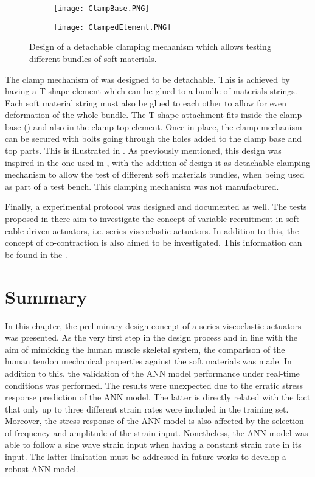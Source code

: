 \begin{figure}[htb!]
	\centering
    \begin{subfigure}[b]{0.49\textwidth}
        \centering
        \texttt{[image: ClampBase.PNG]}
        \caption{}
        \label{fig:ClampBase}
    \end{subfigure}
    \begin{subfigure}[b]{0.49\textwidth}
        \centering
        \texttt{[image: ClampedElement.PNG]}
        \caption{}
        \label{fig:ClampElement}
    \end{subfigure}
    \caption{Design of a detachable clamping mechanism which allows testing different bundles of soft materials.}
    \label{fig:ClampWhole}
\end{figure}

The clamp mechanism of  was designed to be detachable. This is achieved by having a T-shape element which can be glued to a bundle of materials strings. Each soft material string must also be glued to each other to allow for even deformation of the whole bundle. The T-shape attachment fits inside the clamp base () and also in the clamp top element. Once in place, the clamp mechanism can be secured with bolts going through the holes added to the clamp base and top parts. This is illustrated in . As previously mentioned, this design was inspired in the one used in \cite{austin2015control}, with the addition of design it as detachable clamping mechanism to allow the test of different soft materials bundles, when being used as part of a test bench. This clamping mechanism was not manufactured.

Finally, a experimental protocol was designed and documented as well. The tests proposed in there aim to investigate the concept of variable recruitment in soft cable-driven actuators, i.e. series-viscoelastic actuators. In addition to this, the concept of co-contraction is also aimed to be investigated. This information can be found in the .

\section{Summary}


In this chapter, the preliminary design concept of a series-viscoelastic actuators was presented. As the very first step in the design process and in line with the aim of mimicking the human muscle skeletal system, the comparison of the human tendon mechanical properties against the soft materials was made. In addition to this, the validation of the ANN model performance under real-time conditions was performed. The results were unexpected due to the erratic stress response prediction of the ANN model. The latter is directly related with the fact that only up to three different strain rates were included in the training set. Moreover, the stress response of the ANN model is also affected by the selection of frequency and amplitude of the strain input. Nonetheless, the ANN model was able to follow a sine wave strain input when having a constant strain rate in its input. The latter limitation must be addressed in future works to develop a robust ANN model.

